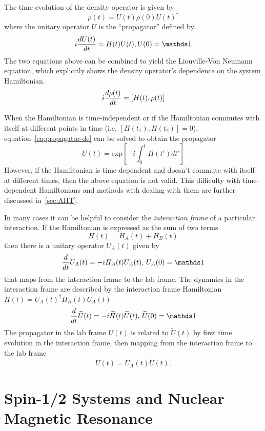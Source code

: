 The time evolution of the density operator is given by
\begin{equation}\label{eq:density-time}
    \rho(t) = U(t) \rho(0) U(t)^\dagger
\end{equation}
where the unitary operator $U$ is the ``propagator'' defined by
\begin{equation}\label{eq:propagator-de}
    i \ddt{U(t)} = H(t) U(t), U(0) = \identity
\end{equation}
The two equations above can be combined to yield the Liouville-Von Neumann equation, which explicitly shows the density operator's dependence on the system Hamiltonian.
\begin{equation}
    i \frac{d \rho(t)}{dt} = [H(t), \rho(t)]
\end{equation}

When the Hamiltonian is time-independent or if the Hamiltonian commutes with itself at different points in time (i.e. $[H(t_1), H(t_2)] = 0$), equation~\ref{eq:propagator-de} can be solved to obtain the propagator
\[
U(t) = \text{exp}\left[ {-i \int_0^t H(t') dt'} \right]
\]
However, if the Hamiltonian is time-dependent and doesn't commute with itself at different times, then the above equation is not valid. This difficulty with time-dependent Hamiltonians and methods with dealing with them are further discussed in~\ref{sec:AHT}.

In many cases it can be helpful to consider the \emph{interaction frame} of a particular interaction. If the Hamiltonian is expressed as the sum of two terms
\[
H(t) = H_A(t) + H_B(t)
\]
then there is a unitary operator $U_A(t)$ given by
\begin{equation}\label{eq:interaction-propagator}
    \frac{d}{dt} U_A(t) = -i H_A(t) U_A(t), \, U_A(0) = \identity
\end{equation}
that maps from the interaction frame to the lab frame.
The dynamics in the interaction frame are described by the interaction frame Hamiltonian $\widetilde{H}(t) = {U_A(t)}^{\dagger} H_B(t)U_A(t)$
\[
\frac{d}{dt}\widetilde{U}(t) = -i \widetilde{H}(t)\widetilde{U}(t),\, \widetilde{U}(0) = \identity
\]
The propagator in the lab frame $U(t)$ is related to $\widetilde{U}(t)$ by first time evolution in the interaction frame, then mapping from the interaction frame to the lab frame
\[
U(t) = U_A(t)\widetilde{U}(t).
\]

\section{Spin-1/2 Systems and Nuclear Magnetic Resonance}


